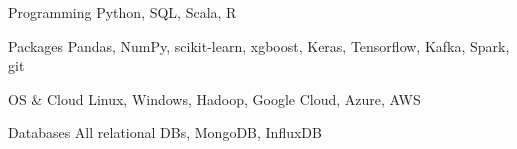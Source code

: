 


\begin{cvskills}


\cvskill
{Programming}
{Python, SQL, Scala, R}

\cvskill
{Packages}
{Pandas, NumPy, scikit-learn, xgboost, Keras, Tensorflow, Kafka, Spark, git}

\cvskill
{OS \& Cloud}
{Linux, Windows, Hadoop, Google Cloud, Azure, AWS}

\cvskill
{Databases}
{All relational DBs, MongoDB, InfluxDB}

\end{cvskills}